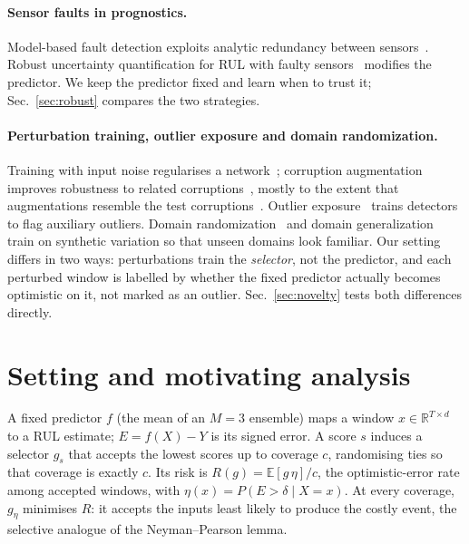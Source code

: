 \documentclass{esannV2}
\begin{document}
\paragraph{Sensor faults in prognostics.} Model-based fault detection exploits analytic redundancy between sensors~\cite{chow1984analytical,isermann2005model}. Robust uncertainty quantification for RUL with faulty sensors~\cite{wang2025robustuq} modifies the predictor. We keep the predictor fixed and learn when to trust it; Sec.~\ref{sec:robust} compares the two strategies.

\paragraph{Perturbation training, outlier exposure and domain randomization.} Training with input noise regularises a network~\cite{bishop1995training}; corruption augmentation improves robustness to related corruptions~\cite{hendrycks2020augmix}, mostly to the extent that augmentations resemble the test corruptions~\cite{mintun2021interaction}. Outlier exposure~\cite{hendrycks2019deep} trains detectors to flag auxiliary outliers. Domain randomization~\cite{tobin2017domain} and domain generalization~\cite{zhou2023domain} train on synthetic variation so that unseen domains look familiar. Our setting differs in two ways: perturbations train the \emph{selector}, not the predictor, and each perturbed window is labelled by whether the fixed predictor actually becomes optimistic on it, not marked as an outlier. Sec.~\ref{sec:novelty} tests both differences directly.

\FloatBarrier
\section{Setting and motivating analysis}\label{sec:theory}
A fixed predictor $f$ (the mean of an $M{=}3$ ensemble) maps a window $x\in\mathbb R^{T\times d}$ to a RUL estimate; $E=f(X)-Y$ is its signed error. A score $s$ induces a selector $g_s$ that accepts the lowest scores up to coverage $c$, randomising ties so that coverage is exactly $c$. Its risk is $R(g)=\mathbb E[g\,\eta]/c$, the optimistic-error rate among accepted windows, with $\eta(x)=P(E>\delta\mid X=x)$. At every coverage, $g_\eta$ minimises $R$: it accepts the inputs least likely to produce the costly event, the selective analogue of the Neyman--Pearson lemma.
\end{document}
